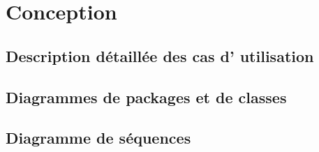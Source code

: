 \chapter{Conception}

\section{Description d\'etaill\'ee des cas d’ utilisation}

\section{Diagrammes de packages et de classes}

\section{Diagramme de s\'equences}
